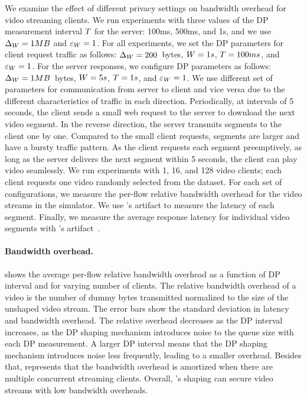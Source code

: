 We examine the effect of different privacy settings on bandwidth overhead for video streaming clients.
We run experiments with three values of the DP measurement interval $T$ for the server:
100ms, 500ms, and 1s, and we use $\Delta_{W} = 1 MB$ and $\varepsilon_{W} = 1$.
For all experiments, we set the DP parameters for client request traffic as follows: $\Delta_{W} = 200$~bytes, $W = 1s$, $T = 100ms$, and $\varepsilon_{W} = 1$.
For the server responses, we configure DP parameters as follows: $\Delta_{W} = 1 MB$~bytes, $W = 5s$, $T = 1 s$, and $\varepsilon_{W} = 1$.
We use different set of parameters for communication from server to client and vice versa due to the different characteristics of traffic in each direction.
Periodically, at intervals of 5 seconds, the client sends a small web request  to the server to download the next video segment. 
In the reverse direction, the server transmits segments to the client one by one.
Compared to the small client requests, segments are larger and have a bursty traffic pattern.
As the client requests each segment preemptively, as long as the server delivers the next segment within 5 seconds, the client can play video seamlessly. 
We run experiments with 1, 16, and 128 video clients; each client requests one video randomly selected from the dataset.
For each set of configurations, we measure the per-flow relative bandwidth overhead for the video streams in the simulator.
We use {\sys}'s artifact to measure the latency of each segment.
Finally, we measure the average response latency for individual video segments with {\sys}'s artifact~\cite{netshaper_repo}.





\paragraph{Bandwidth overhead.}
 shows the average per-flow relative bandwidth overhead as a function of DP interval and for varying number of clients.
The relative bandwidth overhead of a video is the number of dummy bytes transmitted normalized to the size of the unshaped video stream.
The error bars show the standard deviation in latency and bandwidth overhead.
The relative overhead decreases as the DP interval increases, as the DP shaping mechanism introduces noise to the queue size with each DP measurement.
A larger DP interval means that the DP shaping mechanism introduces noise less frequently, leading to a smaller overhead. 
Besides that,  represents that the bandwidth overhead is amortized when there are multiple concurrent streaming clients.
Overall, {\sys}'s shaping can secure video streams with low bandwidth overheads.

